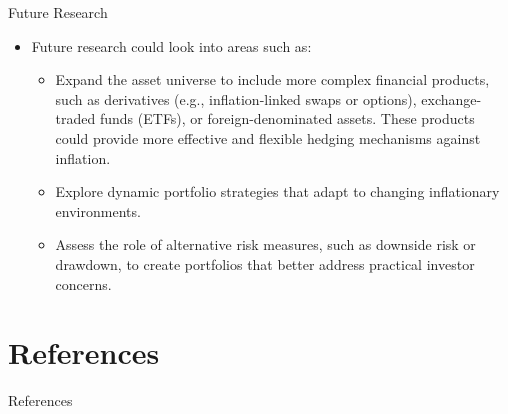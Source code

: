 \documentclass{beamer}
\begin{document}
\begin{frame}{Future Research}
\begin{itemize}
\item Future research could look into areas such as: 
\begin{itemize}
  \item Expand the asset universe to include more complex financial products, such as derivatives (e.g., inflation-linked swaps or options), exchange-traded funds (ETFs), or foreign-denominated assets. These products could provide more effective and flexible hedging mechanisms against inflation.
  \item Explore dynamic portfolio strategies that adapt to changing inflationary environments.
  \item Assess the role of alternative risk measures, such as downside risk or drawdown, to create portfolios that better address practical investor concerns.
\end{itemize}
\end{itemize}
\end{frame}

\section{References}
\begin{frame}[allowframebreaks]{References}
\end{frame}
\end{document}
